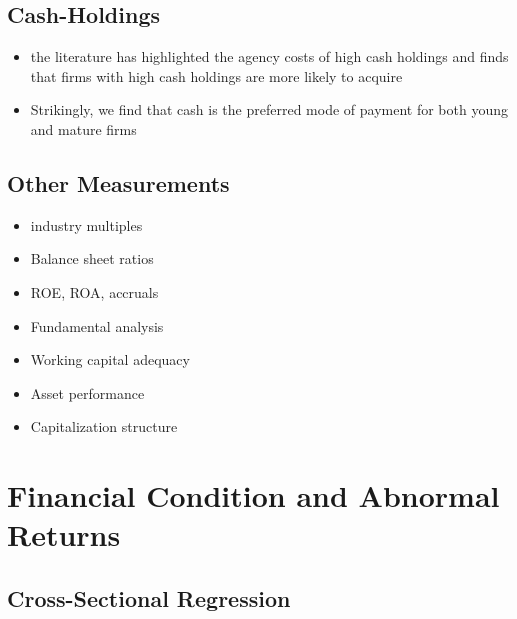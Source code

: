 \documentclass[12pt]{article}
\begin{document}
\subsection{Cash-Holdings}

    \begin{itemize}
        \item the literature has highlighted the agency costs of high cash holdings and finds that firms with high cash holdings are more likely to acquire \citep{Arikan2016}
        \item Strikingly, we find that cash is the preferred mode of payment for both young and mature firms \citep{Arikan2016}
    \end{itemize}

\subsection{Other Measurements} 
    
    \begin{itemize}

        \item industry multiples
        \item Balance sheet ratios
        \item ROE, ROA, accruals 
        \item Fundamental analysis
        \item Working capital adequacy
        \item Asset performance
        \item Capitalization structure

    \end{itemize}

\section{Financial Condition and Abnormal Returns}
\subsection{Cross-Sectional Regression}
\end{document}
